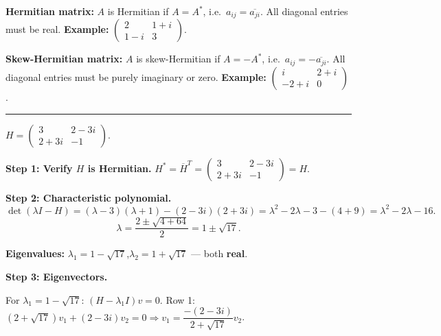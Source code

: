 \documentclass[12pt,a3paper]{article}
\begin{document}
\begin{tcolorbox}[enhanced,breakable,
  colback=cG!4,colframe=cG,boxrule=0.8pt,arc=5pt,
  title={\textbf{Answer --- Hermitian \& Skew-Hermitian Matrices; Eigenvalue Analysis of $H$}},
  fonttitle=\bfseries\color{white},colbacktitle=cG]
 
\textbf{Hermitian matrix:} $A$ is Hermitian if $A = A^*$, i.e.\ $a_{ij} = \overline{a_{ji}}$.
All diagonal entries must be real.
\textbf{Example:} $\begin{pmatrix}2 & 1+i \\ 1-i & 3\end{pmatrix}$.
 
\medskip
\textbf{Skew-Hermitian matrix:} $A$ is skew-Hermitian if $A = -A^*$, i.e.\ $a_{ij} = -\overline{a_{ji}}$.
All diagonal entries must be purely imaginary or zero.
\textbf{Example:} $\begin{pmatrix}i & 2+i \\ -2+i & 0\end{pmatrix}$.
 
\medskip
\textcolor{cG}{\rule{\textwidth}{0.4pt}}
 
$H = \begin{pmatrix}3 & 2-3i \\ 2+3i & -1\end{pmatrix}$.
 
\textbf{Step 1: Verify $H$ is Hermitian.}
$H^* = \overline{H}^T = \begin{pmatrix}3 & 2-3i \\ 2+3i & -1\end{pmatrix} = H$. \checkmark
 
\textbf{Step 2: Characteristic polynomial.}
\[
\det(\lambda I - H) = (\lambda-3)(\lambda+1) - (2-3i)(2+3i)
= \lambda^2 - 2\lambda - 3 - (4+9) = \lambda^2 - 2\lambda - 16.
\]
\[
\lambda = \frac{2 \pm \sqrt{4+64}}{2} = 1 \pm \sqrt{17}.
\]
 
\textbf{Eigenvalues:} $\lambda_1 = 1-\sqrt{17}$,\quad $\lambda_2 = 1+\sqrt{17}$ --- both \textbf{real}. \checkmark
 
\textbf{Step 3: Eigenvectors.}
 
For $\lambda_1 = 1-\sqrt{17}$: $(H-\lambda_1 I)v = 0$.
Row 1: $(2+\sqrt{17})v_1 + (2-3i)v_2 = 0 \Rightarrow v_1 = \dfrac{-(2-3i)}{2+\sqrt{17}}v_2$.
 

\end{tcolorbox}
\end{document}
